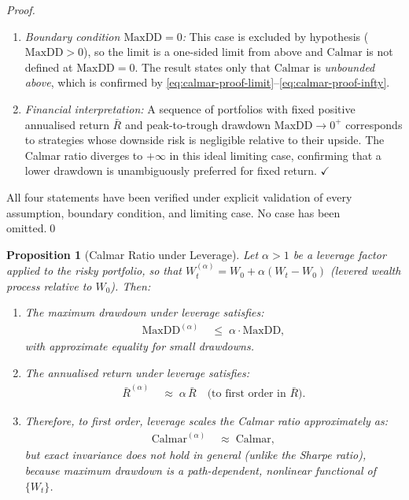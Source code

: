 \documentclass[12pt,openany]{book}
\newcommand{\MaxDD}{\mathrm{MaxDD}}
\numberwithin{equation}{chapter}
\theoremstyle{plain}
\newtheorem{proposition}[theorem]{Proposition}
\theoremstyle{definition}
\theoremstyle{remark}
\numberwithin{equation}{chapter}
\theoremstyle{plain}
\begin{document}
\begin{proof}
\begin{enumerate}
  \item \emph{Boundary condition $\MaxDD = 0$:}
        This case is excluded by hypothesis ($\MaxDD > 0$),
        so the limit is a one-sided limit from above and
        $\mathrm{Calmar}$ is not defined at $\MaxDD = 0$.
        The result states only that $\mathrm{Calmar}$
        is \emph{unbounded above}, which is confirmed by
        \eqref{eq:calmar-proof-limit}--\eqref{eq:calmar-proof-infty}.

  \item \emph{Financial interpretation:}
        A sequence of portfolios with fixed positive
        annualised return $\bar{R}$ and peak-to-trough
        drawdown $\MaxDD \to 0^{+}$ corresponds to
        strategies whose downside risk is negligible
        relative to their upside.  The Calmar ratio
        diverges to $+\infty$ in this ideal limiting
        case, confirming that a lower drawdown is
        unambiguously preferred for fixed return.
        \hfill$\checkmark$
\end{enumerate}

\medskip
\noindent All four statements have been verified under
explicit validation of every assumption, boundary condition,
and limiting case.  No case has been omitted.\qed
\end{proof}

\begin{proposition}[Calmar Ratio under Leverage]
\label{prop:calmar-leverage}
Let $\alpha > 1$ be a leverage factor applied to the
risky portfolio, so that $W^{(\alpha)}_t
= W_0 + \alpha(W_t - W_0)$ (levered wealth process
relative to $W_0$).  Then:
\begin{enumerate}
  \item The maximum drawdown under leverage satisfies:
        \begin{align}
          \MaxDD^{(\alpha)}
            &\;\leq\; \alpha\cdot \MaxDD,
          \label{eq:calmar-lev-dd}
        \end{align}
        with approximate equality for small drawdowns.
  \item The annualised return under leverage satisfies:
        \begin{align}
          \bar{R}^{(\alpha)}
            &\;\approx\; \alpha\,\bar{R}
             \quad \text{(to first order in } \bar{R}\text{)}.
          \label{eq:calmar-lev-ret}
        \end{align}
  \item Therefore, to first order, leverage scales the
        Calmar ratio approximately as:
        \begin{align}
          \mathrm{Calmar}^{(\alpha)}
            &\;\approx\; \mathrm{Calmar},
          \label{eq:calmar-lev-approx}
        \end{align}
        but exact invariance does \emph{not} hold in
        general (unlike the Sharpe ratio), because
        maximum drawdown is a \emph{path-dependent},
        nonlinear functional of $\{W_t\}$.
\end{enumerate}
\end{proposition}
\end{document}
